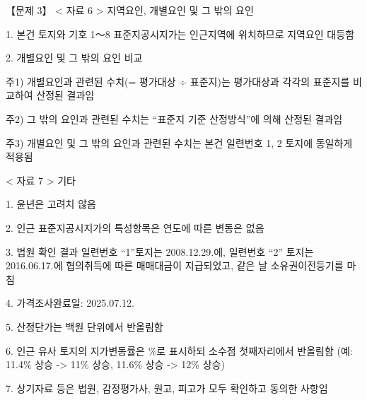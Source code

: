 \begin{longquestion}{【문제 3】}
< 자료 6 > 지역요인, 개별요인 및 그 밖의 요인 \par
1. 본건 토지와 기호 1～8 표준지공시지가는 인근지역에 위치하므로 지역요인 대등함 \par
2. 개별요인 및 그 밖의 요인 비교 \par
{\small\centering
{}\par}

주1) 개별요인과 관련된 수치(= 평가대상 ÷ 표준지)는 평가대상과 각각의 표준지를 비교하여 산정된 결과임 \par
주2) 그 밖의 요인과 관련된 수치는 “표준지 기준 산정방식”에 의해 산정된 결과임 \par
주3) 개별요인 및 그 밖의 요인과 관련된 수치는 본건 일련번호 1, 2 토지에 동일하게 적용됨 \par
< 자료 7 > 기타 \par
1. 윤년은 고려치 않음 \par
2. 인근 표준지공시지가의 특성항목은 연도에 따른 변동은 없음 \par
3. 법원 확인 결과 일련번호 “1”토지는 2008.12.29.에, 일련번호 “2” 토지는 2016.06.17.에 협의취득에 따른 매매대금이 지급되었고, 같은 날 소유권이전등기를 마침 \par
4. 가격조사완료일: 2025.07.12. \par
5. 산정단가는 백원 단위에서 반올림함 \par
6. 인근 유사 토지의 지가변동률은 \%로 표시하되 소수점 첫째자리에서 반올림함 (예: 11.4\% 상승 -> 11\% 상승, 11.6\% 상승 -> 12\% 상승) \par
7. 상기자료 등은 법원, 감정평가사, 원고, 피고가 모두 확인하고 동의한 사항임 \par
\end{longquestion}
